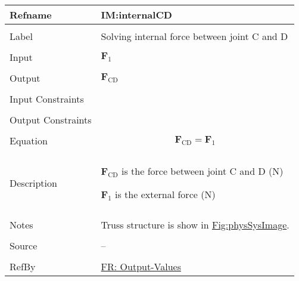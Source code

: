 \documentclass[12pt]{article}
\begin{document}
\vspace{\baselineskip}
\noindent
\begin{minipage}{\textwidth}
\begin{tabular}{>{\raggedright}p{}>{\raggedright\arraybackslash}p{}}
\toprule \textbf{Refname} & \textbf{IM:internalCD}
\label{IM:internalCD}
\\ \midrule \\
Label & Solving internal force between joint C and D
        
\\ \midrule \\
Input & ${\mathbf{F}_{1}}$
        
\\ \midrule \\
Output & ${\mathbf{F}_{\text{CD}}}$
         
\\ \midrule \\
Input Constraints & 
\\ \midrule \\
Output Constraints & 
\\ \midrule \\
Equation & \begin{displaymath}
           {\mathbf{F}_{\text{CD}}}={\mathbf{F}_{1}}
           \end{displaymath}
\\ \midrule \\
Description & \begin{symbDescription}
              \item{${\mathbf{F}_{\text{CD}}}$ is the force between joint C and D (${\text{N}}$)}
              \item{${\mathbf{F}_{1}}$ is the external force (${\text{N}}$)}
              \end{symbDescription}
\\ \midrule \\
Notes & Truss structure is show in \hyperref[Figure:physSysImage]{Fig:physSysImage}.
        
\\ \midrule \\
Source & --
         
\\ \midrule \\
RefBy & \hyperref[outputValues]{FR: Output-Values}
        
\\ \bottomrule
\end{tabular}
\end{minipage}
\end{document}
